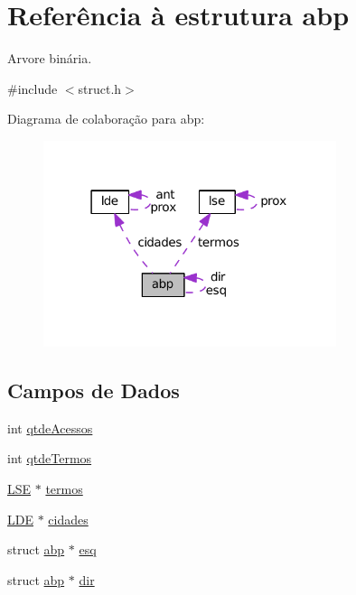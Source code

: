 \hypertarget{structabp}{}\section{Referência à estrutura abp}
\label{structabp}


Arvore binária.  




{\ttfamily \#include $<$struct.\+h$>$}



Diagrama de colaboração para abp\+:\nopagebreak
\begin{figure}[H]
\begin{center}
\leavevmode
\includegraphics[width=243pt]{structabp__coll__graph}
\end{center}
\end{figure}
\subsection*{Campos de Dados}
\begin{DoxyCompactItemize}
\item 
int \hyperlink{structabp_a2ca276b8f2f9e2a163dc0d9504e846c2}{qtde\+Acessos}
\item 
int \hyperlink{structabp_aba05845525837a0260605d109242fb49}{qtde\+Termos}
\item 
\hyperlink{struct_8h_a0d3de75d86bf1db6f749c91f755b870c}{L\+SE} $\ast$ \hyperlink{structabp_a455687e406c855e366193f3ba638ed6d}{termos}
\item 
\hyperlink{struct_8h_ae030205799002e4fc414e374283d8598}{L\+DE} $\ast$ \hyperlink{structabp_ac621929c65d21c284f2897d0dc34777c}{cidades}
\item 
struct \hyperlink{structabp}{abp} $\ast$ \hyperlink{structabp_aa1052089fda0e5ed652bbe60126de869}{esq}
\item 
struct \hyperlink{structabp}{abp} $\ast$ \hyperlink{structabp_a68e9acbab0de7ab617165c904c98334f}{dir}
\end{DoxyCompactItemize}


